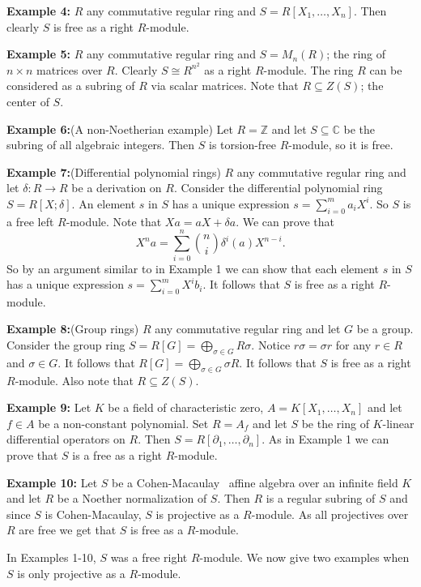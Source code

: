 \documentclass{amsart}
\theoremstyle{plain}
\theoremstyle{definition}
\theoremstyle{remark}
\numberwithin{equation}{theorem}
\begin{document}
\textbf{Example 4:} $R$ any commutative regular ring and $S = R[X_1,\ldots,X_n]$. Then clearly $S$ is free as a right $R$-module.

\textbf{Example 5:} $R$ any commutative regular ring and $S = M_n(R)$; the ring of $n\times n$ matrices over $R$. Clearly $S \cong R^{n^2}$ as a right $R$-module. The ring $R$ can be considered as a subring of $R$ via scalar matrices. Note that $R \subseteq Z(S)$; the center of $S$.

\textbf{Example 6:}(A non-Noetherian example) Let $R = \mathbb{Z}$ and let $S \subseteq \mathbb{C}$ be the subring of all algebraic integers. Then $S$ is torsion-free $R$-module, so it is free.

\textbf{Example 7:}(Differential polynomial rings) $R$ any commutative regular ring and let $\delta \colon R {\rightarrow} R$
be a derivation on $R$. Consider the differential polynomial ring $S = R[X; \delta]$. An element $s$ in $S$ has a unique expression $s = \sum_{i = 0}^{m} a_i X^i$. So $S$ is a free left $R$-module. Note that
$Xa = aX + \delta a$. We can prove that
\[
X^na = \sum_{i =0}^{n} \binom{n}{i} \delta^i(a) X^{n-i}.
\]
So by an argument similar to in Example 1 we can show that each element $s$ in $S$ has a unique expression $s = \sum_{i = 0}^{m}X^ib_i$.  It follows that $S$ is free as a right $R$-module.

\textbf{Example 8:}(Group rings) $R$ any commutative regular ring and let $G$ be a group. Consider the group ring $S =
R[G] = \bigoplus_{\sigma \in G} R\sigma$. Notice $r\sigma = \sigma r$ for any $r \in R$ and $\sigma \in G$. It follows that $R[G] = \bigoplus_{\sigma \in G} \sigma R$. It follows that $S$ is free as a right $R$-module. Also note that
$R \subseteq Z(S)$.

\textbf{Example 9:}  Let $K$ be a field of characteristic zero, $A = K[X_1,\ldots,X_n]$ and  let $f \in A$ be a non-constant polynomial. Set $R = A_f$ and let $S$ be the ring of $K$-linear differential operators on $R$. Then
$S = R[\partial_1,\ldots,\partial_n]$.  As in Example 1 we can prove that $S$ is a free as a right $R$-module.

\textbf{Example 10:} Let $S$ be a {Cohen-Macaulay} \ affine algebra over  an infinite field $K$ and let $R$ be a Noether normalization of $S$. Then $R$ is a regular subring of $S$ and since $S$ is {Cohen-Macaulay}, $S$ is projective as a $R$-module.
As all projectives over $R$ are free we get that $S$ is free as a $R$-module.

In Examples 1-10, $S$ was a free right $R$-module. We now give two examples when $S$ is only projective as a $R$-module.
\end{document}
